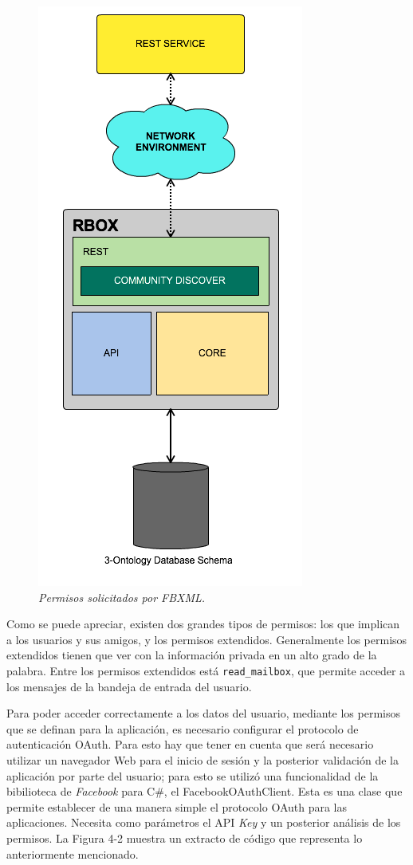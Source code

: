 \begin{figure}
	\centering
	\includegraphics[scale=1]{images/Figura4-1}
	\caption{\em Permisos solicitados por FBXML.}
	\label{fig:ext-im1}
\end{figure}

Como se puede apreciar, existen dos grandes tipos de permisos: los que implican a los usuarios y sus amigos, y los permisos extendidos. Generalmente los permisos extendidos tienen que ver con la información privada en un alto grado de la palabra. Entre los permisos extendidos está \texttt{read\_mailbox}, que permite acceder a los mensajes de la bandeja de entrada del usuario. 

Para poder acceder correctamente a los datos del usuario, mediante los permisos que se definan para la aplicación, es necesario configurar el protocolo de autenticación OAuth. Para esto hay que tener en cuenta que será necesario utilizar un navegador Web para el inicio de sesión y la posterior validación de la aplicación por parte del usuario; para esto se utilizó una funcionalidad de la bibilioteca de \textit{Facebook} para C\#, el FacebookOAuthClient. Esta es una clase que permite establecer de una manera simple el protocolo OAuth para las aplicaciones. Necesita como parámetros el API \textit{Key} y un posterior análisis de los permisos. La Figura 4-2 muestra un extracto de código que representa lo anteriormente mencionado.

